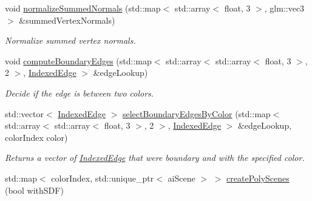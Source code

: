 \begin{DoxyCompactItemize}
\mbox{\label{classpepr3d_1_1_model_exporter_a653be5616accde4e5dbb5c82bb260932}} 
void \mbox{\hyperlink{classpepr3d_1_1_model_exporter_a653be5616accde4e5dbb5c82bb260932}{normalize\+Summed\+Normals}} (std\+::map$<$ std\+::array$<$ float, 3 $>$, glm\+::vec3 $>$ \&summed\+Vertex\+Normals)
\begin{DoxyCompactList}\small\item\em Normalize summed vertex normals. \end{DoxyCompactList}\item 
\mbox{\label{classpepr3d_1_1_model_exporter_ab278eb54afeced3be63e4e5eccdf3802}} 
void \mbox{\hyperlink{classpepr3d_1_1_model_exporter_ab278eb54afeced3be63e4e5eccdf3802}{compute\+Boundary\+Edges}} (std\+::map$<$ std\+::array$<$ std\+::array$<$ float, 3 $>$, 2 $>$, \mbox{\hyperlink{structpepr3d_1_1_model_exporter_1_1_indexed_edge}{Indexed\+Edge}} $>$ \&edge\+Lookup)
\begin{DoxyCompactList}\small\item\em Decide if the edge is between two colors. \end{DoxyCompactList}\item 
\mbox{\label{classpepr3d_1_1_model_exporter_a0ae56b6392c9db26a14ddd7a365a40fc}} 
std\+::vector$<$ \mbox{\hyperlink{structpepr3d_1_1_model_exporter_1_1_indexed_edge}{Indexed\+Edge}} $>$ \mbox{\hyperlink{classpepr3d_1_1_model_exporter_a0ae56b6392c9db26a14ddd7a365a40fc}{select\+Boundary\+Edges\+By\+Color}} (std\+::map$<$ std\+::array$<$ std\+::array$<$ float, 3 $>$, 2 $>$, \mbox{\hyperlink{structpepr3d_1_1_model_exporter_1_1_indexed_edge}{Indexed\+Edge}} $>$ \&edge\+Lookup, color\+Index color)
\begin{DoxyCompactList}\small\item\em Returns a vector of \mbox{\hyperlink{structpepr3d_1_1_model_exporter_1_1_indexed_edge}{Indexed\+Edge}} that were boundary and with the specified color. \end{DoxyCompactList}\item 
\mbox{\label{classpepr3d_1_1_model_exporter_a1e9c64e2f9dd0482f3216ff9cfd016f3}} 
std\+::map$<$ color\+Index, std\+::unique\+\_\+ptr$<$ ai\+Scene $>$ $>$ \mbox{\hyperlink{classpepr3d_1_1_model_exporter_a1e9c64e2f9dd0482f3216ff9cfd016f3}{create\+Poly\+Scenes}} (bool with\+S\+DF)

\end{DoxyCompactItemize}
